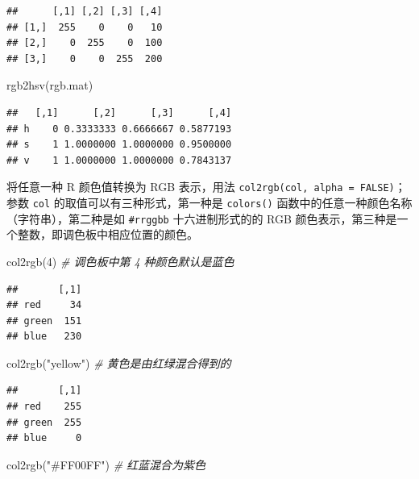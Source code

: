 \documentclass[
  b5paper,
  UTF8,twoside]{book}
\newenvironment{Shaded}{\begin{snugshade}}{\end{snugshade}}
\newcommand{\CommentTok}[1]{\textcolor[rgb]{0.56,0.35,0.01}{\textit{#1}}}
\newcommand{\DecValTok}[1]{\textcolor[rgb]{0.00,0.00,0.81}{#1}}
\newcommand{\FunctionTok}[1]{\textcolor[rgb]{0.00,0.00,0.00}{#1}}
\newcommand{\NormalTok}[1]{#1}
\newcommand{\StringTok}[1]{\textcolor[rgb]{0.31,0.60,0.02}{#1}}
\providecommand{\tightlist}{%
  \setlength{\itemsep}{0pt}\setlength{\parskip}{0pt}}
\begin{document}
\begin{verbatim}
##      [,1] [,2] [,3] [,4]
## [1,]  255    0    0   10
## [2,]    0  255    0  100
## [3,]    0    0  255  200
\end{verbatim}

\begin{Shaded}
\begin{Highlighting}[]
\FunctionTok{rgb2hsv}\NormalTok{(rgb.mat)}
\end{Highlighting}
\end{Shaded}

\begin{verbatim}
##   [,1]      [,2]      [,3]      [,4]
## h    0 0.3333333 0.6666667 0.5877193
## s    1 1.0000000 1.0000000 0.9500000
## v    1 1.0000000 1.0000000 0.7843137
\end{verbatim}

\begin{description}
\tightlist
\item[\texttt{col2rgb()}]
将任意一种 R 颜色值转换为 RGB 表示，用法 \texttt{col2rgb(col,\ alpha\ =\ FALSE)}；参数 \texttt{col} 的取值可以有三种形式，第一种是 \texttt{colors()} 函数中的任意一种颜色名称（字符串），第二种是如 \texttt{\#rrggbb} 十六进制形式的的 RGB 颜色表示，第三种是一个整数，即调色板中相应位置的颜色。
\end{description}

\begin{Shaded}
\begin{Highlighting}[]
\FunctionTok{col2rgb}\NormalTok{(}\DecValTok{4}\NormalTok{) }\CommentTok{\# 调色板中第 4 种颜色默认是蓝色}
\end{Highlighting}
\end{Shaded}

\begin{verbatim}
##       [,1]
## red     34
## green  151
## blue   230
\end{verbatim}

\begin{Shaded}
\begin{Highlighting}[]
\FunctionTok{col2rgb}\NormalTok{(}\StringTok{"yellow"}\NormalTok{) }\CommentTok{\# 黄色是由红绿混合得到的}
\end{Highlighting}
\end{Shaded}

\begin{verbatim}
##       [,1]
## red    255
## green  255
## blue     0
\end{verbatim}

\begin{Shaded}
\begin{Highlighting}[]
\FunctionTok{col2rgb}\NormalTok{(}\StringTok{"\#FF00FF"}\NormalTok{) }\CommentTok{\# 红蓝混合为紫色}
\end{Highlighting}
\end{Shaded}
\end{document}
